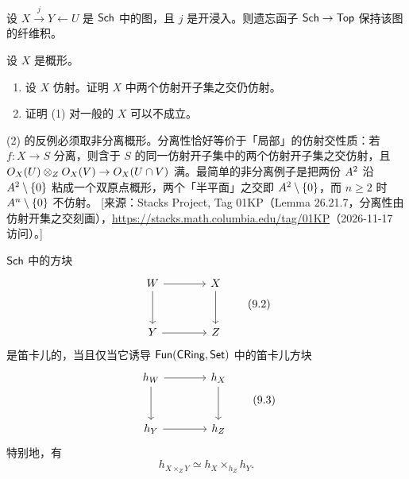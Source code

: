 \begin{corollary}\label{cor:9.3.3}
设 $X \xrightarrow{j} Y \leftarrow U$ 是 $\mathsf{Sch}$ 中的图，且 $j$ 是开浸入。则遗忘函子 $\mathsf{Sch} \to \mathsf{Top}$ 保持该图的纤维积。
\end{corollary}

\begin{exercise}\label{exc:9.3.4}
设 $X$ 是概形。
\begin{enumerate}[label=(\arabic*),leftmargin=2em,itemsep=0.25ex]
  \item 设 $X$ 仿射。证明 $X$ 中两个仿射开子集之交仍仿射。
  \item 证明 (1) 对一般的 $X$ 可以不成立。
\end{enumerate}
\end{exercise}

\begin{yizhu}
(2) 的反例必须取非分离概形。分离性恰好等价于「局部」的仿射交性质：若 $f \colon X \to S$ 分离，则含于 $S$ 的同一仿射开子集中的两个仿射开子集之交仿射，且 $O_X(U) \otimes_Z O_X(V) \to O_X(U \cap V)$ 满。最简单的非分离例子是把两份 $A^2$ 沿 $A^2 \setminus \{0\}$ 粘成一个双原点概形，两个「半平面」之交即 $A^2 \setminus \{0\}$，而 $n \ge 2$ 时 $A^n \setminus \{0\}$ 不仿射。
[来源：Stacks Project, Tag 01KP（Lemma 26.21.7，分离性由仿射开集之交刻画），\url{https://stacks.math.columbia.edu/tag/01KP}（2026-11-17 访问）。]
\end{yizhu}

\begin{proposition}\label{prop:9.3.5}
$\mathsf{Sch}$ 中的方块
\[
\begin{tikzcd}[column sep=3.8em,row sep=3em]
W \arrow[r] \arrow[d] & X \arrow[d]\\
Y \arrow[r] & Z
\end{tikzcd}
\tag{9.2}
\]
是笛卡儿的，当且仅当它诱导 $\mathsf{Fun}(\mathsf{CRing},\mathsf{Set})$ 中的笛卡儿方块
\[
\begin{tikzcd}[column sep=3.8em,row sep=3em]
h_W \arrow[r] \arrow[d] & h_X \arrow[d]\\
h_Y \arrow[r] & h_Z
\end{tikzcd}
\tag{9.3}
\]
特别地，有
\[
h_{X \times_Z Y} \simeq h_X \times_{h_Z} h_Y .
\tag{9.4}
\]
\end{proposition}

